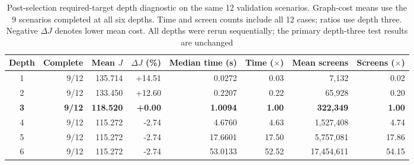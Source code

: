 \begin{table}[t]
  \centering
  \caption{Post-selection required-target depth diagnostic on the same 12 validation scenarios. Graph-cost means use the 9 scenarios completed at all six depths. Time and screen counts include all 12 cases; ratios use depth three. Negative $\Delta J$ denotes lower mean cost. All depths were rerun sequentially; the primary depth-three test results are unchanged}
  \label{tab:depth-sensitivity}
  \renewcommand{\arraystretch}{1.08}
  \setlength{\tabcolsep}{5pt}
  \footnotesize
  \begin{tabular*}{\linewidth}{@{\extracolsep{\fill}}crrrrrrr@{}}
    \toprule
    Depth & Complete & Mean $J$ & $\Delta J$ (\%) & Median time (s) & Time ($\times$) & Mean screens & Screens ($\times$) \\
    \midrule
    1 & 9/12 & 135.714 & +14.51 & 0.0272 & 0.03 & 7,132 & 0.02 \\
    2 & 9/12 & 133.450 & +12.60 & 0.2207 & 0.22 & 65,928 & 0.20 \\
    \textbf{3} & \textbf{9/12} & \textbf{118.520} & \textbf{+0.00} & \textbf{1.0094} & \textbf{1.00} & \textbf{322,349} & \textbf{1.00} \\
    4 & 9/12 & 115.272 & -2.74 & 4.6760 & 4.63 & 1,527,408 & 4.74 \\
    5 & 9/12 & 115.272 & -2.74 & 17.6601 & 17.50 & 5,757,081 & 17.86 \\
    6 & 9/12 & 115.272 & -2.74 & 53.0133 & 52.52 & 17,454,611 & 54.15 \\
    \bottomrule
  \end{tabular*}
\end{table}
